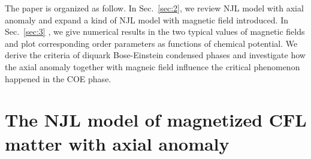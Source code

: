 \documentclass[prd, showpacs,nofootinbib,amsmath,amssymb,12pt]{revtex4}
\begin{document}
The paper is organized as follow.
In Sec.~\ref{sec:2}, we review  NJL model with axial anomaly  and expand  a kind of NJL model with magnetic field introduced.
In Sec.~\ref{sec:3} , we give  numerical results in the two typical values of magnetic fields
and plot corresponding order parameters as functions of  chemical potential.
 We derive the criteria  of diquark Bose-Einstein condensed phases and 
 investigate how the axial anomaly together with magneic field influence the critical phenomenon happened in the COE phase.

\section{The NJL model of magnetized CFL matter with axial anomaly}
\label{sec:1}
\end{document}
